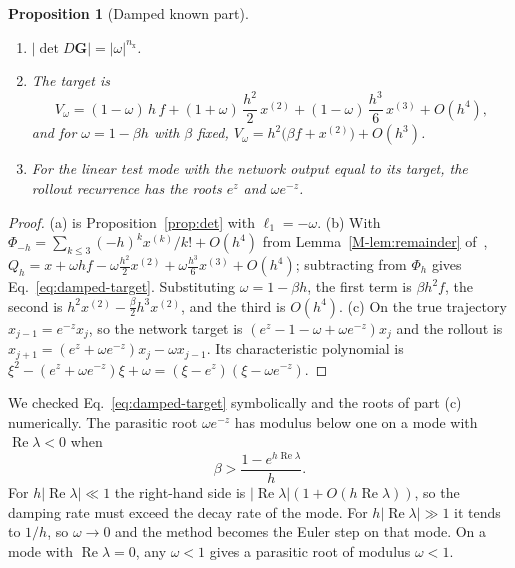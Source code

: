\documentclass[11pt]{article}
\newcommand{\Mref}[1]{\ref{M-#1} of~\cite{main}}
\newtheorem{proposition}{Proposition}
\theoremstyle{definition}
\theoremstyle{remark}
\newcommand{\bG}{\mathbf{G}}
\begin{document}
\begin{proposition}[Damped known part]\label{prop:damped}
\begin{enumerate}[label=(\alph*)]
\item $|\det D\bG| = |\omega|^{n_{\mathrm x}}$.
\item The target is
\begin{equation}\label{eq:damped-target}
V_\omega = (1-\omega)\,h\,f + (1+\omega)\,\frac{h^2}{2}\,x^{(2)} + (1-\omega)\,\frac{h^3}{6}\,x^{(3)} + O(h^4),
\end{equation}
and for $\omega = 1 - \beta h$ with $\beta$ fixed, $V_\omega = h^2\big(\beta f + x^{(2)}\big) + O(h^3)$.
\item For the linear test mode with the network output equal to its target, the rollout recurrence has the roots $e^z$ and $\omega e^{-z}$.
\end{enumerate}
\end{proposition}

\begin{proof}
(a) is Proposition~\ref{prop:det} with $\ell_1 = -\omega$.
(b) With $\Phi_{-h} = \sum_{k\le3}(-h)^kx^{(k)}/k! + O(h^4)$ from Lemma~\Mref{lem:remainder}, $Q_h = x + \omega hf - \omega\tfrac{h^2}{2}x^{(2)} + \omega\tfrac{h^3}{6}x^{(3)} + O(h^4)$; subtracting from $\Phi_h$ gives Eq.~\eqref{eq:damped-target}.
Substituting $\omega = 1 - \beta h$, the first term is $\beta h^2f$, the second is $h^2x^{(2)} - \tfrac{\beta}{2}h^3x^{(2)}$, and the third is $O(h^4)$.
(c) On the true trajectory $x_{j-1} = e^{-z}x_j$, so the network target is $(e^z - 1 - \omega + \omega e^{-z})x_j$ and the rollout is $x_{j+1} = (e^z + \omega e^{-z})x_j - \omega x_{j-1}$.
Its characteristic polynomial is $\xi^2 - (e^z + \omega e^{-z})\xi + \omega = (\xi - e^z)(\xi - \omega e^{-z})$.
\end{proof}

We checked Eq.~\eqref{eq:damped-target} symbolically and the roots of part (c) numerically.
The parasitic root $\omega e^{-z}$ has modulus below one on a mode with $\operatorname{Re}\lambda < 0$ when
\begin{equation}\label{eq:beta-condition}
\beta > \frac{1 - e^{h\operatorname{Re}\lambda}}{h} .
\end{equation}
For $h|\operatorname{Re}\lambda| \ll 1$ the right-hand side is $|\operatorname{Re}\lambda|(1 + O(h\operatorname{Re}\lambda))$, so the damping rate must exceed the decay rate of the mode.
For $h|\operatorname{Re}\lambda| \gg 1$ it tends to $1/h$, so $\omega \to 0$ and the method becomes the Euler step on that mode.
On a mode with $\operatorname{Re}\lambda = 0$, any $\omega < 1$ gives a parasitic root of modulus $\omega < 1$.
\end{document}

